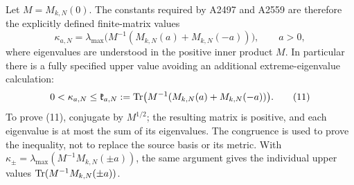 Let \(M=M_{k,N}(0)\). The constants required by A2497 and A2559 are
therefore the explicitly defined finite-matrix values
\[
 \kappa_{a,N}=\lambda_{\max}
       \bigl(M^{-1}(M_{k,N}(a)+M_{k,N}(-a))\bigr),\qquad a>0,
 \tag{10}
\]
where eigenvalues are understood in the positive inner product \(M\).
In particular there is a fully specified upper value avoiding an
additional extreme-eigenvalue calculation:
\[
 0<\kappa_{a,N}\le
 \mathfrak k_{a,N}:=
 \operatorname{Tr}\bigl(M^{-1}(M_{k,N}(a)+M_{k,N}(-a))\bigr).
 \tag{11}
\]
To prove (11), conjugate by \(M^{1/2}\); the resulting matrix is
positive, and each eigenvalue is at most the sum of its eigenvalues.
The congruence is used to prove the inequality, not to replace the
source basis or its metric. With
\(\kappa_\pm=\lambda_{\max}(M^{-1}M_{k,N}(\pm a))\), the same
argument gives the individual upper values
\(\operatorname{Tr}(M^{-1}M_{k,N}(\pm a))\).

